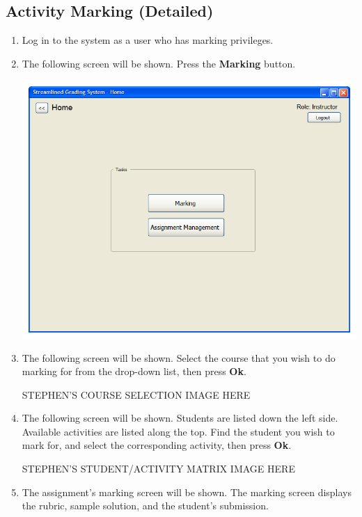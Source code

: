 \documentclass{article}
\begin{document}
\subsection{Activity Marking (Detailed)}
\begin{enumerate}
  \item Log in to the system as a user who has marking privileges.
  \item The following screen will be shown.  Press the \textbf{Marking} button.
  \begin{center} 
   \includegraphics[scale=0.55]{../images/UIMockups/pngs/LandingPage}
  \end{center}
  \item The following screen will be shown.  Select the course that you wish
    to do marking for from the drop-down list, then press \textbf{Ok}.
    \begin{center} 
      STEPHEN'S COURSE SELECTION IMAGE HERE
    \end{center}
  \item The following screen will be shown.  Students are listed down the left
    side. Available activities are listed along the top.  Find the student you
    wish to mark for, and select the corresponding activity, then press \textbf{Ok}.
  \begin{center} 
    STEPHEN'S STUDENT/ACTIVITY MATRIX IMAGE HERE
  \end{center}
  \item The assignment's marking screen will be shown.  The marking screen
    displays the rubric, sample solution, and the student's submission.

\end{enumerate}
\end{document}
